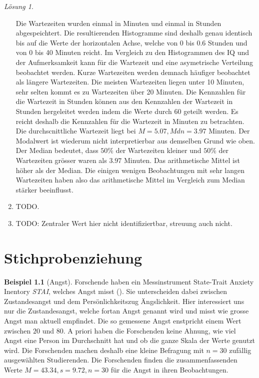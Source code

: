 \documentclass[
]{book}
\theoremstyle{definition}
\theoremstyle{definition}
\newtheorem{example}{Beispiel}[chapter]
\theoremstyle{definition}
\theoremstyle{definition}
\theoremstyle{remark}
\newtheorem*{solution}{Lösung}
\begin{document}
\begin{solution}
\begin{enumerate}
  Die Wartezeiten wurden einmal in Minuten und einmal in Stunden abgespeichtert. Die resultierenden Histogramme sind deshalb genau identisch bis auf die Werte der horizontalen Achse, welche von 0 bis 0.6 Stunden und von 0 bis 40 Minuten reicht. Im Vergleich zu den Histogrammen des IQ und der Aufmerksamkeit kann für die Wartezeit und eine asymetrische Verteilung beobachtet werden. Kurze Wartezeiten werden demnach häufiger beobachtet als längere Wartezeiten. Die meisten Wartezeiten liegen unter 10 Minuten, sehr selten kommt es zu Wartezeiten über 20 Minuten. Die Kennzahlen für die Wartezeit in Stunden können aus den Kennzahlen der Wartezeit in Stunden hergeleitet werden indem die Werte durch \(60\) geteilt werden. Es reicht deshalb die Kennzahlen für die Wartezeit in Minuten zu betrachten. Die durchscnittliche Wartezeit liegt bei \(M=5.07, Mdn = 3.97\) Minuten. Der Modalwert ist wiederum nicht interpretierbar aus demselben Grund wie oben. Der Median bedeutet, dass \(50\%\) der Wartezeiten kleiner und \(50\%\) der Wartezeiten grösser waren als \(3.97\) Minuten. Das arithmetische Mittel ist höher als der Median. Die einigen wenigen Beobachtungen mit sehr langen Wartezeiten haben also das arithmetische Mittel im Vergleich zum Median stärker beeinflusst.
\item
  TODO.
\item
  TODO: Zentraler Wert hier nicht identifiziertbar, streuung auch nicht.
\end{enumerate}

\end{solution}

\chapter{Stichprobenziehung}\label{stichprobenziehung}

\begin{example}[Angst]
\protect\hypertarget{exm:angst}{}\label{exm:angst}Forschende haben ein Messinstrument State-Trait Anxiety Inentory \emph{STAI}, welches Angst misst (). Sie unterscheiden dabei zwischen Zustandesangst und dem Persönlichkeitszug Ängslichkeit. Hier interessiert uns nur die Zustandesangst, welche fortan Angst genannt wird und misst wie grosse Angst man aktuell empfindet. Die so gemessene Angst enstpricht einem Wert zwischen \(20\) und \(80\). A priori haben die Forschenden keine Ahnung, wie viel Angst eine Person im Durchschnitt hat und ob die ganze Skala der Werte genutzt wird. Die Forschenden machen deshalb eine kleine Befragung mit \(n =30\) zufällig ausgewählten Studierenden. Die Forschenden finden die zusammenfassenden Werte \(M=43.34, s = 9.72, n = 30\) für die Angst in ihren Beobachtungen.
\end{example}
\end{document}
